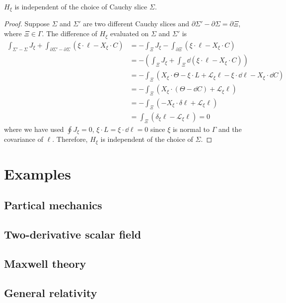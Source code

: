 \documentclass[10pt]{article}
\begin{document}
\begin{claim}
    $H_\xi$ is independent of the choice of Cauchy slice $\Sigma$.
\end{claim}
\begin{proof}
    Suppose $\Sigma$ and $\Sigma'$ are two different Cauchy slices and $\partial\Sigma'-\partial\Sigma=\partial\Xi$, where $\Xi\in\Gamma$.
    The difference of $H_\xi$ evaluated on $\Sigma$ and $\Sigma'$ is 
    \begin{equation}
        \begin{split}
            \int_{\Sigma'-\Sigma}J_{\xi}+\int_{\partial\Sigma'-\partial\Sigma}(\xi\cdot\ell-X_\xi\cdot C)&=-\int_{\Xi}J_\xi-\int_{\partial\Xi}(\xi\cdot\ell-X_\xi\cdot C)\\
                                                                                                         &=-\left(\int_{\Xi}J_\xi+\int_{\Xi}\dd(\xi\cdot\ell-X_\xi\cdot C)\right)\\
                                                                                                         &=-\int_{\Xi}\left(X_\xi\cdot\Theta-\xi\cdot L+\mathcal{L}_\xi \ell-\xi\cdot\dd{\ell}-X_\xi\cdot\dd{C}\right)\\
                                                                                                         &=-\int_{\Xi}\left(X_\xi\cdot(\Theta-\dd{C})+\mathcal{L}_\xi \ell\right)\\
                                                                                                         &=-\int_{\Xi}\left(-X_\xi\cdot\delta\ell+\mathcal{L}_\xi \ell\right)\\
                                                                                                         &=\int_{\Xi}(\delta_\xi\ell-\mathcal{L}_\xi \ell)=0
        \end{split}
    \end{equation}
    where we have used $\oint J_\xi=0$, $\xi\cdot L=\xi\cdot\dd{\ell}=0$ since $\xi$ is normal to $\Gamma$ and the covariance of $\ell$.
    Therefore, $H_\xi$ is independent of the choice of $\Sigma$.
\end{proof}

\section{Examples}
\subsection{Partical mechanics}

\subsection{Two-derivative scalar field}

\subsection{Maxwell theory}

\subsection{General relativity}

\clearpage


\end{document}
